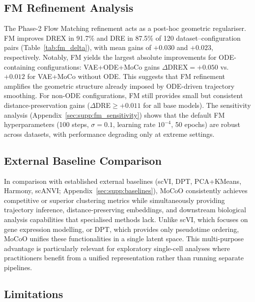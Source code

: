 \documentclass[preprint,12pt,number]{elsarticle}
\begin{document}
\subsection{FM Refinement Analysis}
\label{sec:discussion:fm}

The Phase-2 Flow Matching refinement acts as a post-hoc geometric regulariser. FM improves DREX in 91.7\% and DRE in 87.5\% of 120 dataset--configuration pairs (Table~\ref{tab:fm_delta}), with mean gains of $+0.030$ and $+0.023$, respectively. Notably, FM yields the largest absolute improvements for ODE-containing configurations: VAE+ODE+MoCo gains $\Delta$DREX$=+0.050$ vs.\ $+0.012$ for VAE+MoCo without ODE. This suggests that FM refinement amplifies the geometric structure already imposed by ODE-driven trajectory smoothing. For non-ODE configurations, FM still provides small but consistent distance-preservation gains ($\Delta$DRE$\geq+0.011$ for all base models). The sensitivity analysis (Appendix~\ref{sec:supp:fm_sensitivity}) shows that the default FM hyperparameters (100 steps, $\sigma{=}0.1$, learning rate $10^{-4}$, 50 epochs) are robust across datasets, with performance degrading only at extreme settings.

\subsection{External Baseline Comparison}
\label{sec:discussion:baselines}

In comparison with established external baselines (scVI, DPT, PCA+KMeans, Harmony, scANVI; Appendix~\ref{sec:supp:baselines}), MoCoO consistently achieves competitive or superior clustering metrics while simultaneously providing trajectory inference, distance-preserving embeddings, and downstream biological analysis capabilities that specialised methods lack. Unlike scVI, which focuses on gene expression modelling, or DPT, which provides only pseudotime ordering, MoCoO unifies these functionalities in a single latent space. This multi-purpose advantage is particularly relevant for exploratory single-cell analyses where practitioners benefit from a unified representation rather than running separate pipelines.

\subsection{Limitations}
\label{sec:discussion:limitations}
\end{document}

